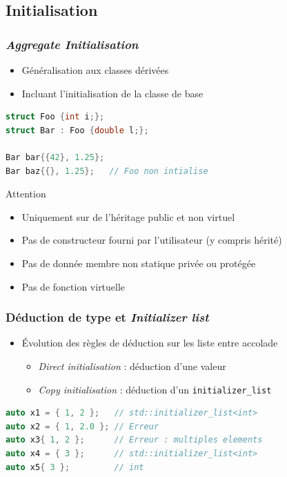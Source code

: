 \documentclass[C++.tex]{subfiles}
\begin{document}
\subsection*{Initialisation}
\begin{frame}[fragile]
	\frametitle{\textit{Aggregate Initialisation}}
	\begin{itemize}
		\item Généralisation aux classes dérivées
		\item Incluant l'initialisation de la classe de base
	\end{itemize}

	\begin{lstlisting}[language=C++]
struct Foo {int i;};
struct Bar : Foo {double l;};

Bar bar{{42}, 1.25};
Bar baz{{}, 1.25};   // Foo non intialise\end{lstlisting}

	\begin{alertblock}{Attention}
		\begin{itemize}
			\item Uniquement sur de l'héritage public et non virtuel
			\item Pas de constructeur fourni par l'utilisateur (y compris hérité)
			\item Pas de donnée membre non statique privée ou protégée
			\item Pas de fonction virtuelle
		\end{itemize}
	\end{alertblock}

\end{frame}

\begin{frame}[fragile]
	\frametitle{Déduction de type et \textit{Initializer list}}
	\begin{itemize}
		\item Évolution des règles de déduction sur les liste entre accolade
		\begin{itemize}
			\item \textit{Direct initialisation} : déduction d'une valeur
			
			
			\item \textit{Copy initialisation} : déduction d'un \lstinline|initializer_list|
			
		\end{itemize}
	\end{itemize}

	\begin{lstlisting}[language=C++]
auto x1 = { 1, 2 };   // std::initializer_list<int>
auto x2 = { 1, 2.0 }; // Erreur
auto x3{ 1, 2 };      // Erreur : multiples elements
auto x4 = { 3 };      // std::initializer_list<int>
auto x5{ 3 };         // int\end{lstlisting}
\end{frame}
\end{document}

